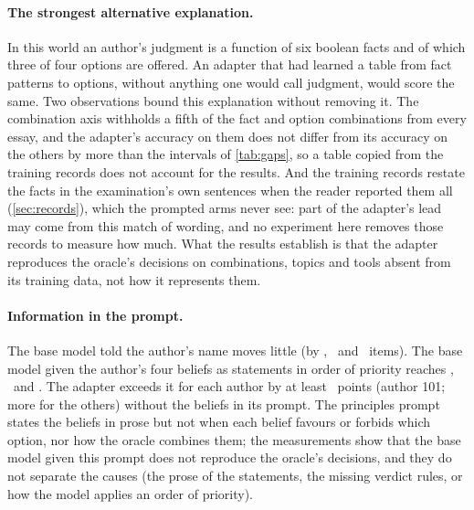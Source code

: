 \paragraph{The strongest alternative explanation.}
In this world an author's judgment is a function of six boolean facts and of which three of
four options are offered. An adapter that had learned a table from fact patterns to options,
without anything one would call judgment, would score the same. Two observations bound this
explanation without removing it. The combination axis withholds a fifth of the fact and option
combinations from every essay, and the adapter's accuracy on them does not differ from its
accuracy on the others by more than the intervals of \cref{tab:gaps}, so a table copied from
the training records does not account for the results. And the training records restate the
facts in the examination's own sentences when the reader reported them all
(\cref{sec:records}), which the prompted arms never see: part of the adapter's lead may come
from this match of wording, and no experiment here removes those records to measure how much.
What the results establish is that the adapter reproduces the oracle's decisions on
combinations, topics and tools absent from its training data, not how it represents them.

\paragraph{Information in the prompt.}
The base model told the author's name moves little (by \LiftANamed, \LiftBNamed\ and
\LiftCNamed\ items). The base model given the author's four beliefs as statements in order of
priority reaches \AccAPrinciples, \AccBPrinciples\ and \AccCPrinciples. The adapter exceeds it
for each author by at least \LeadPtsTunedPrinciplesA\ points (author 101; more for the
others) without the beliefs in its prompt. The principles prompt states the beliefs in prose
but not when each belief favours or forbids which option, nor how the oracle combines them;
the measurements show that the base model given this prompt does not reproduce the oracle's
decisions, and they do not separate the causes (the prose of the statements, the missing
verdict rules, or how the model applies an order of priority).


